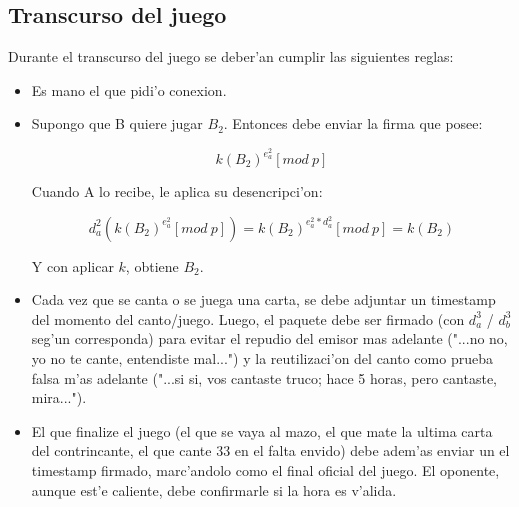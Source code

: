 \subsection{Transcurso del juego}
Durante el transcurso del juego se deber'an cumplir las siguientes reglas:

\begin{itemize}
\item Es mano el que pidi'o conexion.

\item Supongo que B quiere jugar $B_2$. Entonces debe enviar la firma que posee:

$$	k(B_2)^{e^2_a} [mod\ p] $$
	
Cuando A lo recibe, le aplica su desencripci'on:

$$	d^2_a(k(B_2)^{e^2_a} [mod\ p]) = 
	k(B_2)^{e^2_a * d^2_a} [mod\ p] = 
	k(B_2) $$

Y con aplicar $k$, obtiene $B_2$.

\item Cada vez que se canta o se juega una carta, se debe adjuntar un timestamp del momento del canto/juego. Luego, el paquete debe ser firmado (con $d^3_a$ / $d^3_b$ seg'un corresponda) para evitar el repudio del emisor mas adelante ("...no no, yo no te cante, entendiste mal...") y la reutilizaci'on del canto como prueba falsa m'as adelante ("...si si, vos cantaste truco; hace 5 horas, pero cantaste, mira...").

\item El que finalize el juego (el que se vaya al mazo, el que mate la ultima carta del contrincante, el que cante 33 en el falta envido) debe adem'as enviar un el timestamp firmado, marc'andolo como el final oficial del juego. El oponente, aunque est'e caliente, debe confirmarle si la hora es v'alida.

\end{itemize}
